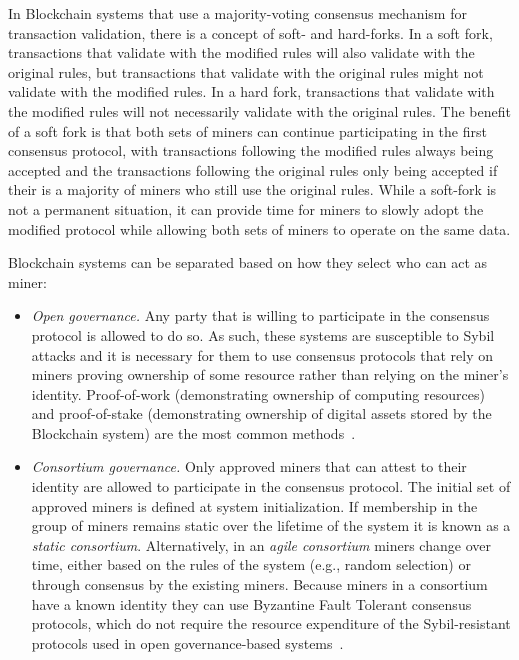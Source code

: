 In Blockchain systems that use a majority-voting consensus mechanism for transaction validation, there is a concept of soft- and hard-forks.
In a soft fork, transactions that validate with the modified rules will also validate with the original rules, but transactions that validate with the original rules might not validate with the modified rules.
In a hard fork, transactions that validate with the modified rules will not necessarily validate with the original rules.
The benefit of a soft fork is that both sets of miners can continue participating in the first consensus protocol, with transactions following the modified rules always being accepted and the transactions following the original rules only being accepted if their is a majority of miners who still use the original rules.
While a soft-fork is not a permanent situation, it can provide time for miners to slowly adopt the modified protocol while allowing both sets of miners to operate on the same data.

Blockchain systems can be separated based on how they select who can act as miner:

\begin{itemize}
	\item \emph{Open governance.}
	Any party that is willing to participate in the consensus protocol is allowed to do so.
	As such, these systems are susceptible to Sybil attacks and it is necessary for them to use consensus protocols that rely on miners  proving ownership of some resource rather than relying on the miner's identity.
	Proof-of-work (demonstrating ownership of computing resources) and proof-of-stake (demonstrating ownership of digital assets stored by the Blockchain system) are the most common methods~\cite{Bano17,garay2018consensus}.
	
	\item \emph{Consortium governance.}
	Only approved miners that can attest to their identity are allowed to participate in the consensus protocol.
	The initial set of approved miners is defined at system initialization.
	If membership in the group of miners remains static over the lifetime of the system it is known as a \emph{static consortium}.
	Alternatively, in an \emph{agile consortium} miners change over time, either based on the rules of the system (e.g., random selection) or through consensus by the existing miners.
	Because miners in a consortium have a known identity they can use Byzantine Fault Tolerant consensus protocols, which do not require the resource expenditure of the Sybil-resistant protocols used in open governance-based systems~\cite{Bano17,garay2018consensus}.		
\end{itemize}

